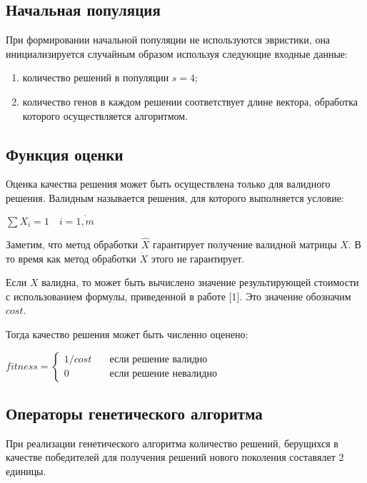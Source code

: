 \subsection*{Начальная популяция}
При формировании начальной популяции не используются эвристики, она инициализируется случайным образом используя следующие входные данные:
\begin{enumerate}
  \item количество решений в популяции $s = 4$;
  \item количество генов в каждом решении соответствует длине вектора, обработка которого осуществляется алгоритмом.
\end{enumerate}

\subsection*{Функция оценки}
Оценка качества решения может быть осуществлена только для валидного решения. Валидным называется решения, для которого выполняется условие:
\begin{center}
  $\displaystyle \sum X_{i} = 1 \quad i=\overline{1, m}$
\end{center}

Заметим, что метод обработки $\hat{X}$ гарантирует получение валидной матрицы $X$. В то время как метод обработки $\dot{X}$ этого не гарантирует.

Если $X$ валидна, то может быть вычислено значение результирующей стоимости с использованием формулы, приведенной в работе [1]. Это значение обозначим $cost$.

Тогда качество решения может быть численно оценено:
\begin{center}
  $
  \displaystyle fitness =
  \begin{cases}
    1 / cost & \quad \text{если решение валидно} \\
    0 & \quad \text{если решение невалидно}
  \end{cases}
  $
\end{center}

\subsection*{Операторы генетического алгоритма}
При реализации генетического алгоритма количество решений, берущихся в качестве победителей для получения решений нового поколения составялет $2$ единицы.

